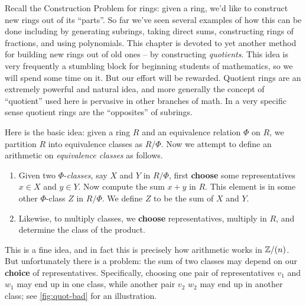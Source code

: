 Recall the Construction Problem for rings: given a ring, we'd like to construct new rings out of its ``parts''.
So far we've seen several examples of how this can be done including by generating subrings, taking direct sums, constructing rings of fractions, and using polynomials.
This chapter is devoted to yet another method for building new rings out of old ones -- by constructing \emph{quotients}.
This idea is very frequently a stumbling block for beginning students of mathematics, so we will spend some time on it.
But our effort will be rewarded.
Quotient rings are an extremely powerful and natural idea, and more generally the concept of ``quotient'' used here is pervasive in other branches of math.
In a very specific sense quotient rings are the ``opposites'' of subrings.

Here is the basic idea: given a ring \(R\) and an equivalence relation \(\Phi\) on \(R\), we partition \(R\) into equivalence classes as \(R/\Phi\).
Now we attempt to define an arithmetic on \emph{equivalence classes} as follows.
\begin{enumerate}
\item Given two \(\Phi\)-\emph{classes}, say \(X\) and \(Y\) in \(R/\Phi\), first \textbf{choose} some representatives \(x \in X\) and \(y \in Y\).
Now compute the sum \(x+y\) in \(R\).
This element is in some other \(\Phi\)-class \(Z\) in \(R/\Phi\).
We define \(Z\) to be the sum of \(X\) and \(Y\).
\item Likewise, to multiply classes, we \textbf{choose} representatives, multiply in \(R\), and determine the class of the product.
\end{enumerate}
This is a fine idea, and in fact this is precisely how arithmetic works in \(\mathbb{Z}/(n)\).
But unfortunately there is a problem: the sum of two classes may depend on our \textbf{choice} of representatives.
Specifically, choosing one pair of representatives \(v_1\) and \(w_1\) may end up in one class, while another pair \(v_2\) \(w_2\) may end up in another class; see \autoref{fig:quot-bad} for an illustration.
